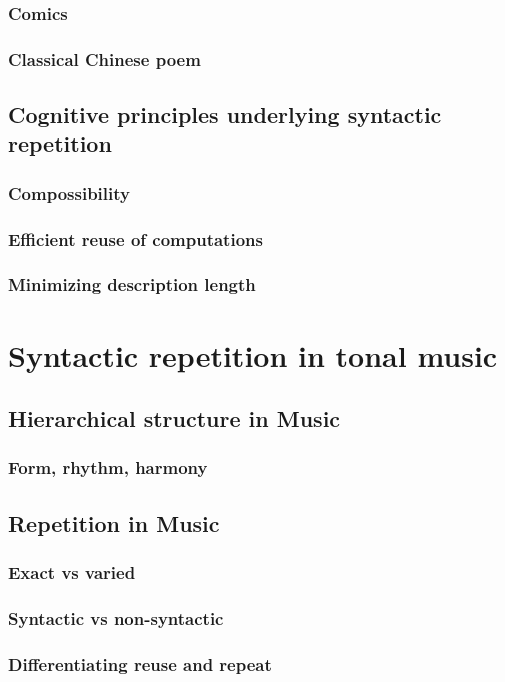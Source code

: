         \subsection{Comics}
        \subsection{Classical Chinese poem}
    \section{Cognitive principles underlying syntactic repetition}
        \subsection{Compossibility}
        \subsection{Efficient reuse of computations}
        \subsection{Minimizing description length}


\chapter{Syntactic repetition in tonal music}
    \section{Hierarchical structure in Music}
        \subsection{Form, rhythm, harmony}
    \section{Repetition in Music}
        \subsection{Exact vs varied}
        \subsection{Syntactic vs non-syntactic}
        \subsection{Differentiating reuse and repeat}


